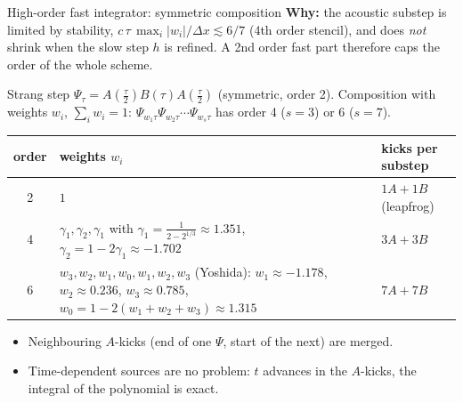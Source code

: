 \documentclass[aspectratio=169,10pt]{beamer}
\begin{document}
\begin{frame}{High-order fast integrator: symmetric composition}
  \textbf{Why:} the acoustic substep is limited by stability, $c\,\tau\,\max_i|w_i|/\Delta x\lesssim 6/7$ (4th order stencil), and does
  \emph{not} shrink when the slow step $h$ is refined. A 2nd order fast part therefore caps the order of the whole scheme.

  \medskip
  Strang step $\Psi_\tau=A(\tfrac\tau2)B(\tau)A(\tfrac\tau2)$ (symmetric, order 2). Composition with weights $w_i$, $\sum_iw_i=1$:
  $\Psi_{w_1\tau}\Psi_{w_2\tau}\cdots\Psi_{w_s\tau}$ has order 4 ($s=3$) or 6 ($s=7$).
  \medskip

  \footnotesize
  \begin{tabular}{@{}cp{}l@{}}
    \toprule
    order & weights $w_i$ & kicks per substep\\
    \midrule
    2 & $1$ & $1A+1B$ (leapfrog)\\
    4 & $\gamma_1,\gamma_2,\gamma_1$ with $\gamma_1=\frac1{2-2^{1/3}}\approx1.351$, $\gamma_2=1-2\gamma_1\approx-1.702$ & $3A+3B$\\
    6 & $w_3,w_2,w_1,w_0,w_1,w_2,w_3$ (Yoshida): $w_1\approx-1.178$, $w_2\approx0.236$, $w_3\approx0.785$, $w_0=1-2(w_1+w_2+w_3)\approx1.315$ & $7A+7B$\\
    \bottomrule
  \end{tabular}
  \normalsize
  \begin{itemize}
    \item Neighbouring $A$-kicks (end of one $\Psi$, start of the next) are merged.
    \item Time-dependent sources are no problem: $t$ advances in the $A$-kicks, the integral of the polynomial is exact.
  \end{itemize}
\end{frame}
\end{document}
